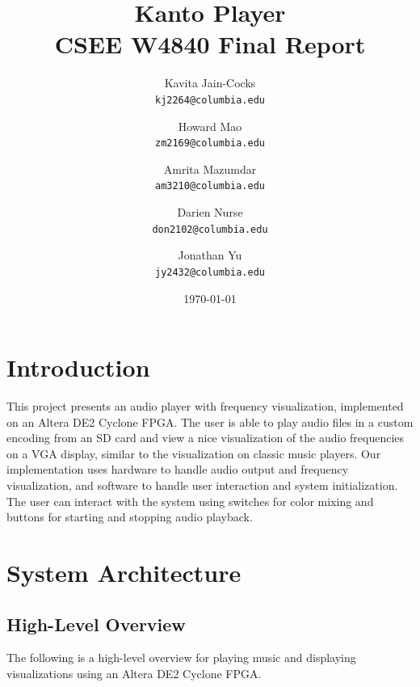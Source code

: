 \documentclass{article}
\title{Kanto Player \\
CSEE W4840 Final Report}
\author{
  Kavita Jain-Cocks\\
  \texttt{kj2264@columbia.edu}
  \and
  Howard Mao\\
  \texttt{zm2169@columbia.edu}
  \and
  Amrita Mazumdar\\
  \texttt{am3210@columbia.edu}
  \and
  Darien Nurse\\
  \texttt{don2102@columbia.edu}
  \and
  Jonathan Yu\\
  \texttt{jy2432@columbia.edu}
   \\}
\date{\today}
\begin{document}
\maketitle
\newpage

\section{Introduction}
This project presents an audio player with frequency visualization, implemented
on an Altera DE2 Cyclone FPGA. The user is able to play audio files in a custom
encoding from an SD card and view a nice visualization of the audio frequencies
on a VGA display, similar to the visualization on classic music players. Our
implementation uses hardware to handle audio output and frequency
visualization, and software to handle user interaction and system
initialization. The user can interact with the system using switches for color
mixing and buttons for starting and stopping audio playback.

\section{System Architecture}

\subsection{High-Level Overview}

The following is a high-level overview for playing music and displaying 
visualizations using an Altera DE2 Cyclone FPGA.
\end{document}
